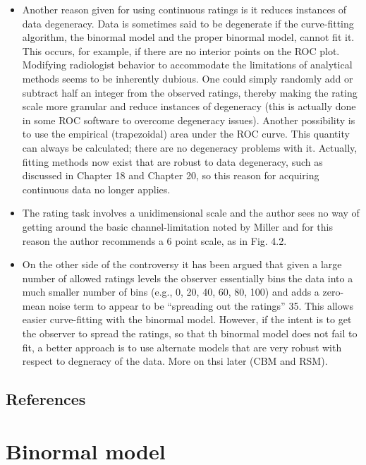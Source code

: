\documentclass[
]{book}
\begin{document}
\begin{itemize}
\item
  Another reason given for using continuous ratings is it reduces instances of data degeneracy. Data is sometimes said to be degenerate if the curve-fitting algorithm, the binormal model and the proper binormal model, cannot fit it. This occurs, for example, if there are no interior points on the ROC plot. Modifying radiologist behavior to accommodate the limitations of analytical methods seems to be inherently dubious. One could simply randomly add or subtract half an integer from the observed ratings, thereby making the rating scale more granular and reduce instances of degeneracy (this is actually done in some ROC software to overcome degeneracy issues). Another possibility is to use the empirical (trapezoidal) area under the ROC curve. This quantity can always be calculated; there are no degeneracy problems with it. Actually, fitting methods now exist that are robust to data degeneracy, such as discussed in Chapter 18 and Chapter 20, so this reason for acquiring continuous data no longer applies.
\item
  The rating task involves a unidimensional scale and the author sees no way of getting around the basic channel-limitation noted by Miller and for this reason the author recommends a 6 point scale, as in Fig. 4.2.
\item
  On the other side of the controversy it has been argued that given a large number of allowed ratings levels the observer essentially bins the data into a much smaller number of bins (e.g., 0, 20, 40, 60, 80, 100) and adds a zero-mean noise term to appear to be ``spreading out the ratings'' 35. This allows easier curve-fitting with the binormal model. However, if the intent is to get the observer to spread the ratings, so that th binormal model does not fail to fit, a better approach is to use alternate models that are very robust with respect to degneracy of the data. More on thsi later (CBM and RSM).
\end{itemize}

\hypertarget{references}{%
\section{References}\label{references}}

\hypertarget{BinMod}{%
\chapter{Binormal model}\label{BinMod}}
\end{document}
